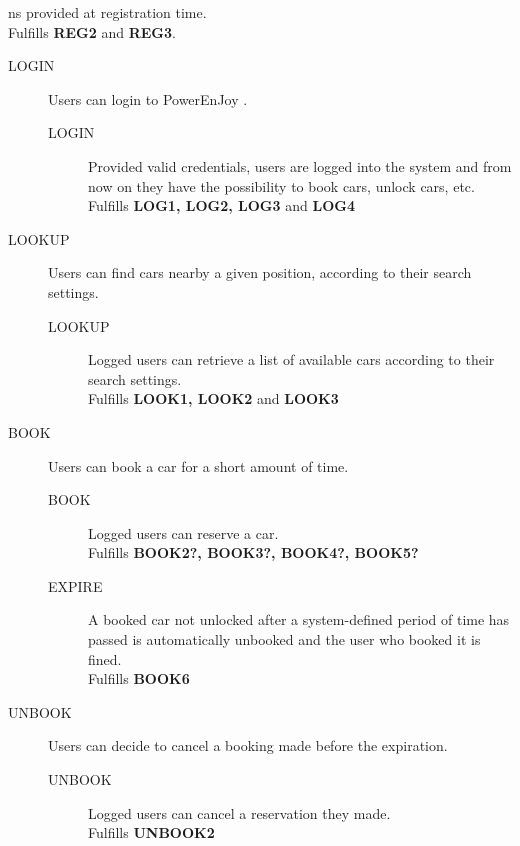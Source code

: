 \documentclass[11pt]{article} %
\newcommand{\pe}{PowerEnJoy }
\begin{document}
ns provided at registration time. \\ Fulfills \textbf{REG2} and \textbf{REG3}.
	\begin{description}
	\item[LOGIN] Users can login to \pe.\hfill {\color{red}{double-check LOG4}}
		\begin{description}
			\item[LOGIN] Provided valid credentials, users are logged into the system and from now on they have the possibility to book cars, unlock cars, etc. \\ Fulfills \textbf{LOG1, LOG2, LOG3} and \textbf{LOG4}
		\end{description}

	\item[LOOKUP] Users can find cars nearby a given position, according to their search settings. \hfill  {\color{red}{missing LOOK4, LOOK5, LOOK6}}
		\begin{description}
			\item[LOOKUP] Logged users can retrieve a list of available cars according to their search settings.\\ Fulfills \textbf{LOOK1, LOOK2} and \textbf{LOOK3} 
		\end{description}

	\item[BOOK] Users can book a car for a short amount of time.\hfill {\color{red}{double-check. Missing BOOK1. EXPIRE added}}
		\begin{description}
			\item[BOOK] Logged users can reserve a car. \\ Fulfills \textbf{BOOK2?, BOOK3?, BOOK4?, BOOK5? }
			\item[EXPIRE] A booked car not unlocked after a system-defined period of time has passed is automatically unbooked and the user who booked it is fined. \\ Fulfills \textbf{BOOK6}
		\end{description}

	\item[UNBOOK] Users can decide to cancel a booking made before the expiration.\hfill {\color{red}{Missing UNBOOK1}}
		\begin{description}
			\item[UNBOOK] Logged users can cancel a reservation they made. \\ Fulfills \textbf{UNBOOK2}
		\end{description}


\end{description}
\end{document}
